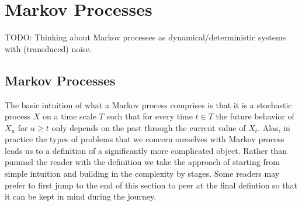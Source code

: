 \chapter{Markov Processes}

TODO: Thinking about Markov processes as dynamical/deterministic
systems with (transduced) noise.

\section{Markov Processes}
The basic intuition of what a Markov process comprises is that it is a
stochastic process $X$ on a time scale $T$ such that for every time $t \in
T$ the future behavior of $X_u$ for $u \geq t$ only depends on the
past through the current value of $X_t$.  Alas, in practice the types
of problems that we concern ourselves with Markov process leads us to
a definition of a significantly more complicated object.  Rather than
pummel the reader with the definition we take the approach of starting
from simple intuition and building in the complexity by stages.  Some
readers may prefer to first jump to the end of this section to peer at
the final defintion so that it can be kept in mind during the journey.

